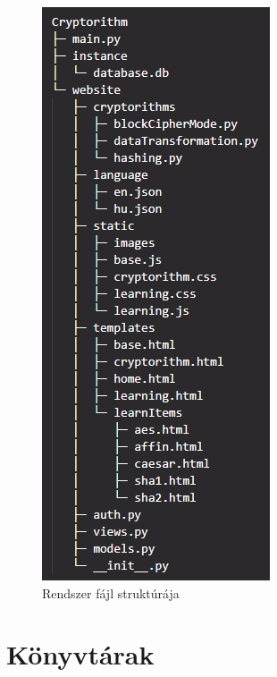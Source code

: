 \begin{figure}[!h]
	\centering
	\includegraphics[scale=0.8]{images/fájlStruktúra}
	\caption{Rendszer fájl struktúrája}
\end{figure}

\section {Könyvtárak}

